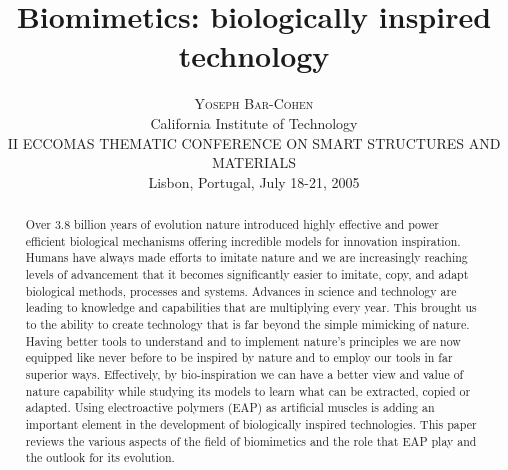 \documentclass[twoside]{article}
\title{\vspace{-15mm}\fontsize{24pt}{10pt}\selectfont\textbf{
Biomimetics: biologically inspired technology
}} %
\author{
\large
\textsc{Yoseph Bar-Cohen}\\[2mm] %
\normalsize California Institute of Technology\\ %
\normalsize II ECCOMAS THEMATIC CONFERENCE ON SMART STRUCTURES AND MATERIALS\\
Lisbon, Portugal, July 18-21, 2005
\vspace{-5mm}
}
\date{}
\begin{document}
\maketitle %

\thispagestyle{fancy} %


\begin{abstract}

\noindent Over 3.8 billion years of evolution nature introduced highly effective and power efficient 
biological mechanisms offering incredible models for innovation inspiration. Humans have always 
made efforts to imitate nature and we are increasingly reaching levels of advancement that it 
becomes significantly easier to imitate, copy, and adapt biological methods, processes and systems. 
Advances in science and technology are leading to knowledge and capabilities that are multiplying 
every year. This brought us to the ability to create technology that is far beyond the simple 
mimicking of nature. Having better tools to understand and to implement nature's principles we are 
now equipped like never before to be inspired by nature and to employ our tools in far superior 
ways. Effectively, by bio-inspiration we can have a better view and value of nature capability while 
studying its models to learn what can be extracted, copied or adapted. Using electroactive polymers 
(EAP) as artificial muscles is adding an important element in the development of biologically 
inspired technologies. This paper reviews the various aspects of the field of biomimetics and the 
role that EAP play and the outlook for its evolution. 

\end{abstract}

\end{document}
